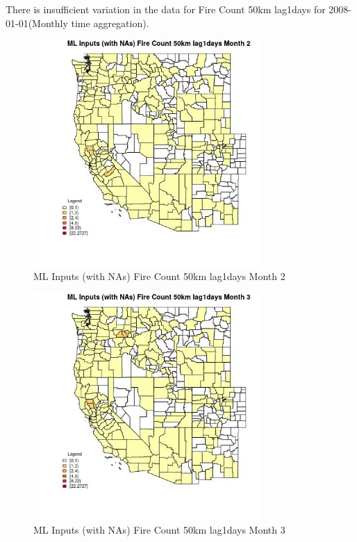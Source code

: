 There is insufficient variation in the data for Fire Count 50km lag1days for 2008-01-01(Monthly time aggregation). 
 

\begin{figure} 
\centering  
\includegraphics[width=0.77\textwidth]{Code_Outputs/Report_ML_input_PM25_Step4_part_f_de_duplicated_aves_prioritize_24hr_obswNAs_CountyFire_Count_50km_lag1daysmedianMonth2.jpg} 
\caption{\label{fig:Report_ML_input_PM25_Step4_part_f_de_duplicated_aves_prioritize_24hr_obswNAsCountyFire_Count_50km_lag1daysmedianMonth2}ML Inputs (with NAs) Fire Count 50km lag1days Month 2} 
\end{figure} 
 

\begin{figure} 
\centering  
\includegraphics[width=0.77\textwidth]{Code_Outputs/Report_ML_input_PM25_Step4_part_f_de_duplicated_aves_prioritize_24hr_obswNAs_CountyFire_Count_50km_lag1daysmedianMonth3.jpg} 
\caption{\label{fig:Report_ML_input_PM25_Step4_part_f_de_duplicated_aves_prioritize_24hr_obswNAsCountyFire_Count_50km_lag1daysmedianMonth3}ML Inputs (with NAs) Fire Count 50km lag1days Month 3} 
\end{figure} 
 


